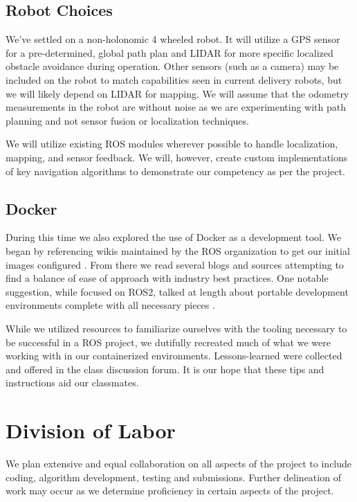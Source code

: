 \documentclass{article}
\begin{document}
\begin{multicols}{2}
\subsection*{Robot Choices}
We've settled on a non-holonomic 4 wheeled robot. It will utilize a GPS sensor for a pre-determined, global path plan and LIDAR for more specific localized obstacle avoidance during operation. Other sensors (such as a camera) may be included on the robot to match capabilities seen in current delivery robots, but we will likely depend on LIDAR for mapping. We will assume that the odometry measurements in the robot are without noise as we are experimenting with path planning and not sensor fusion or localization techniques.

We will utilize existing ROS modules wherever possible to handle localization, mapping, and sensor feedback. We will, however, create custom implementations of key navigation algorithms to demonstrate our competency as per the project.

\subsection*{Docker}
During this time we also explored the use of Docker as a development tool. We began by referencing wikis maintained by the ROS organization to get our initial images configured \cite{ROS-Docker}. From there we read several blogs and sources attempting to find a balance of ease of approach with industry best practices. One notable suggestion, while focused on ROS2, talked at length about portable development environments complete with all necessary pieces \cite{Thackston}.

While we utilized resources to familiarize ourselves with the tooling necessary to be successful in a ROS project, we dutifully recreated much of what we were working with in our containerized environments. Lessons-learned were collected and offered in the class discussion forum. It is our hope that these tips and instructions aid our classmates.

\section*{Division of Labor}
We plan extensive and equal collaboration on all aspects of the project to include coding, algorithm development, testing and submissions. Further delineation of work may occur as we determine proficiency in certain aspects of the project.


\label{References}


\end{multicols}
\end{document}
